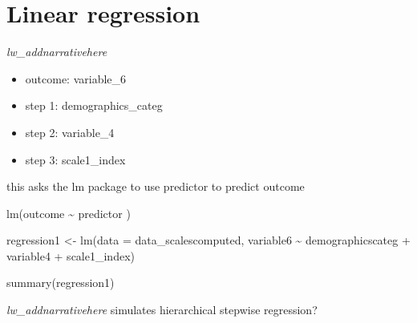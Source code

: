 \documentclass[
  letterpaper,
  DIV=11,
  numbers=noendperiod]{scrreprt}
\newenvironment{Shaded}{\begin{snugshade}}{\end{snugshade}}
\newcommand{\AttributeTok}[1]{\textcolor[rgb]{0.40,0.45,0.13}{#1}}
\newcommand{\FunctionTok}[1]{\textcolor[rgb]{0.28,0.35,0.67}{#1}}
\newcommand{\NormalTok}[1]{\textcolor[rgb]{0.00,0.23,0.31}{#1}}
\newcommand{\OtherTok}[1]{\textcolor[rgb]{0.00,0.23,0.31}{#1}}
\newcommand{\SpecialCharTok}[1]{\textcolor[rgb]{0.37,0.37,0.37}{#1}}
\providecommand{\tightlist}{%
  \setlength{\itemsep}{0pt}\setlength{\parskip}{0pt}}\usepackage{longtable,booktabs,array}
\begin{document}

\chapter{Linear regression}\label{linear-regression}

\emph{lw\_addnarrativehere}

\begin{itemize}
\tightlist
\item
  outcome: variable\_6
\item
  step 1: demographics\_categ
\item
  step 2: variable\_4
\item
  step 3: scale1\_index
\end{itemize}

this asks the lm package to use predictor to predict outcome

lm(outcome \textasciitilde{} predictor )

\begin{Shaded}
\begin{Highlighting}[]
\NormalTok{regression1 }\OtherTok{\textless{}{-}} \FunctionTok{lm}\NormalTok{(}\AttributeTok{data =}\NormalTok{ data\_scalescomputed, variable6 }\SpecialCharTok{\textasciitilde{}}\NormalTok{ demographicscateg }\SpecialCharTok{+}\NormalTok{ variable4 }\SpecialCharTok{+}\NormalTok{ scale1\_index)}

\FunctionTok{summary}\NormalTok{(regression1)}
\end{Highlighting}
\end{Shaded}

\emph{lw\_addnarrativehere} simulates hierarchical stepwise regression?
\end{document}
